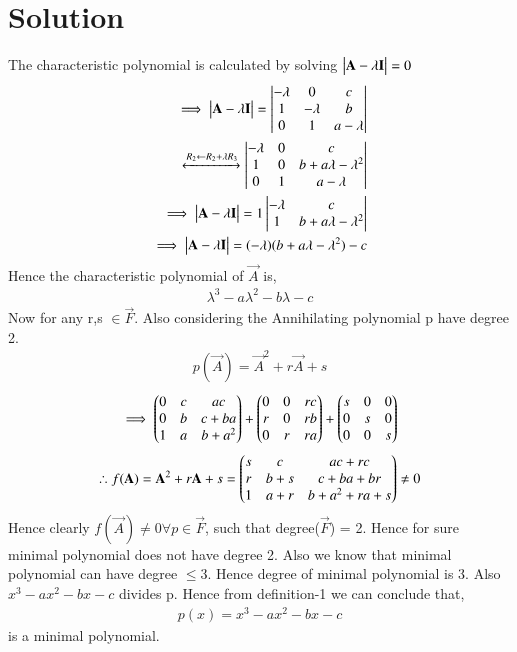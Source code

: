 \documentclass[journal,12pt,twocolumn]{IEEEtran}
\begin{document}
\section{Solution}
The characteristic polynomial is calculated by solving $\begin{vmatrix}\mathbf{A}-\lambda \mathbf{I}\end{vmatrix} = 0$
\begin{align}
\implies \begin{vmatrix}\mathbf{A}-\lambda \mathbf{I}\end{vmatrix} = \begin{vmatrix}-\lambda &0&c\\1&-\lambda &b\\0&1&a-\lambda\end{vmatrix}\\
\xleftrightarrow[]{R_2\leftarrow R_2+\lambda R_3} \begin{vmatrix}-\lambda &0&c\\1&0&b+a\lambda-\lambda^2\\0&1&a-\lambda\end{vmatrix}\\
\implies \begin{vmatrix}\mathbf{A}-\lambda \mathbf{I}\end{vmatrix} = 1\begin{vmatrix}-\lambda & c \\1 & b+a\lambda-\lambda^2\end{vmatrix}\\
\implies \begin{vmatrix}\mathbf{A}-\lambda \mathbf{I}\end{vmatrix} = (-\lambda)( b+a\lambda-\lambda^2) - c
\end{align}
Hence the characteristic polynomial of $\vec{A}$ is,
\begin{align}
\lambda^3-a\lambda^2-b\lambda-c
\label{cp}
\end{align}
Now for any r,s $\in \vec{F}$. Also considering the Annihilating polynomial p have degree 2.
\begin{align}
p(\vec{A}) = \vec{A}^2+r\vec{A}+s
\end{align}
\begin{align}
\implies \begin{pmatrix}0&c&ac\\0&b&c+ba\\1&a&b+a^2\end{pmatrix} + \begin{pmatrix}0&0&rc\\r&0&rb\\0&r&ra\end{pmatrix}+ \begin{pmatrix}s&0&0\\0&s&0\\0&0&s\end{pmatrix}
\end{align}
\begin{align}
\therefore f(\mathbf{A}) = \mathbf{A}^2+r\mathbf{A}+s = \begin{pmatrix}s&c&ac+rc\\r&b+s&c+ba+br\\1&a+r&b+a^2+ra+s\end{pmatrix} \neq 0
\label{fa}
\end{align}
Hence clearly $f(\vec{A})\neq 0 \forall p \in \vec{F}$, such that degree($\vec{F}$) = 2. Hence for sure minimal polynomial does not have degree 2. Also we know that minimal polynomial can have degree $\leq 3$. Hence degree of minimal polynomial is 3. Also $x^3-ax^2-bx-c$ divides p. Hence from definition-1 we can conclude that,
\begin{align}
p(x) = x^3-ax^2-bx-c
\end{align} 
is a minimal polynomial.
\end{document}
